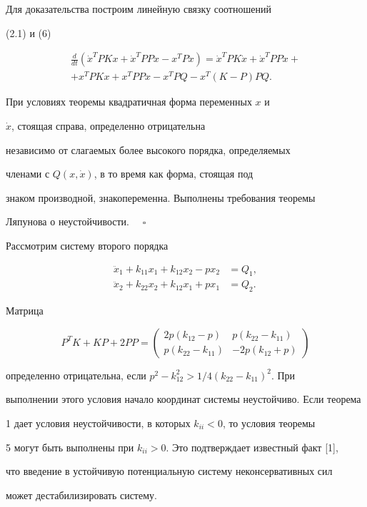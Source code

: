 Для доказательства построим линейную связку соотношений


(2.1) и (6)


\begin{gather*}


\frac{d}{dt}(\Dot{x}^{T}PKx+ \Dot{x}^{T}PPx- x^{T}P \Dot{x})=


\Dot{x}^{T}PK\Dot{x} + \Dot{x}^{T}PP \Dot{x}+ \\


%


+x^{T}PKx+x^{T}PPx-x^{T}PQ -x^{T}(K-P)PQ.


\end{gather*}


При условиях теоремы квадратичная форма переменных $x$ и


$\Dot x$, стоящая справа, определенно отрицательна


независимо от слагаемых более высокого порядка, определяемых


членами с $Q(x,\Dot x)$, в то время как форма, стоящая под


знаком производной, знакопеременна. Выполнены требования теоремы


Ляпунова о неустойчивости. $\quad\square$





\begin{exam} Рассмотрим систему второго порядка


\begin{align*}


\ddot x_{1}+k_{11}x_{1}+k_{12}x_{2}-px_{2}&=Q_{1}, \\


%


\ddot x_{2}+k_{22}x_{2}+k_{12}x_{1}+px_{1}&=Q_{2}.


\end{align*}


Матрица


$$


P^{T}K+KP+2PP =


\begin{pmatrix}


2p(k_{12}-p) & p(k_{22}-k_{11}) \\


p(k_{22}-k_{11}) & -2p(k_{12}+p)


\end{pmatrix}


$$


определенно отрицательна, если $p^{2}-k_{12}^{2}>1/4(k_{22}-k_{11})^{2}$. При


выполнении этого условия начало координат системы неустойчиво. Если теорема


1 дает условия неустойчивости, в которых $k_{ii}<0$, то условия теоремы


5 могут быть выполнены при $k_{ii}>0$. Это подтверждает известный факт [1],


что введение в устойчивую потенциальную систему неконсервативных сил


может дестабилизировать систему.


\end{exam}





